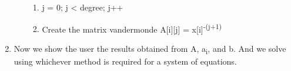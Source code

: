 \documentclass[12pt]{article}
\renewcommand{\_}{\kern-1.5pt\textunderscore\kern-1.5pt}
\begin{document}
\begin{enumerate}
\begin{enumerate}
\begin{enumerate}
	\item {\fontsize{13pt}{15.6pt}\selectfont j = 0; j < degree; j++\par}\par

	\item {\fontsize{13pt}{15.6pt}\selectfont Create the matrix vandermonde A[i][j] = x[i]\textsuperscript{-(j+1) }\par}\par


\end{enumerate}
\end{enumerate}
	\item {\fontsize{13pt}{15.6pt}\selectfont Now we show the user the results obtained from A, a\textsubscript{i}, and\textsubscript{ }b. And we solve using whichever method is required for a system of equations. \par}
\end{enumerate}\par


\printbibliography
\end{document}
